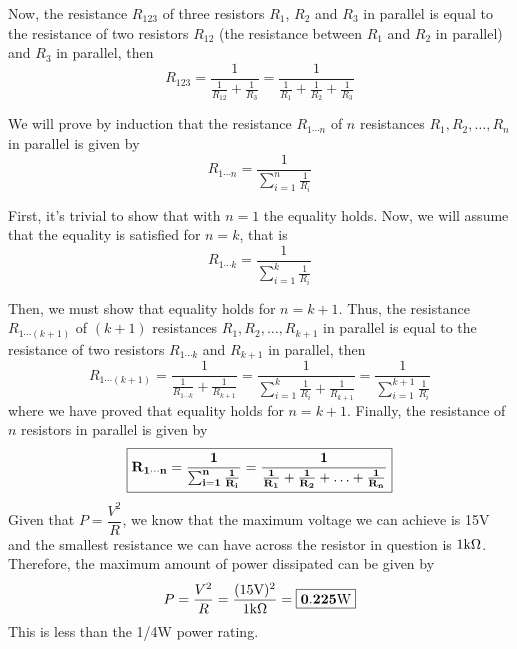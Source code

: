 \documentclass{article}
\begin{document}
    Now, the resistance $R_{123}$ of three resistors $R_{1}$, $R_{2}$ and $R_{3}$ in parallel is equal to the resistance of two resistors $R_{12}$ (the resistance between $R_{1}$ and $R_{2}$ in parallel) and $R_{3}$ in parallel, then \[R_{123} = \frac{1}{\frac{1}{R_{12}}+\frac{1}{R_{3}}} = \frac{1}{\frac{1}{R_{1}}+\frac{1}{R_{2}}+\frac{1}{R_{3}}}\]
    
    We will prove by induction that the resistance $R_{1\cdots n}$ of $n$ resistances $R_{1}, R_{2}, \ldots, R_{n}$ in parallel is given by \[R_{1\cdots n} = \dfrac{1}{\sum_{i=1}^{n}\frac{1}{R_{i}}}\]

    First, it's trivial to show that with $n = 1$ the equality holds. Now, we will assume that the equality is satisfied for $n = k$, that is
    \[R_{1\cdots k} = \dfrac{1}{\sum_{i=1}^{k}\frac{1}{R_{i}}}\]

    Then, we must show that equality holds for $n = k+1$. Thus, the resistance $R_{1\cdots (k+1)}$ of $(k+1)$ resistances $R_{1}, R_{2}, \ldots, R_{k+1}$ in parallel is equal to the resistance of two resistors $R_{1\cdots k}$ and $R_{k+1}$ in parallel, then \[R_{1\cdots (k+1)} = \frac{1}{\frac{1}{R_{1\cdots k}}+\frac{1}{R_{k+1}}} = \frac{1}{\sum_{i=1}^{k}\frac{1}{R_{i}}+\frac{1}{R_{k+1}}} = \frac{1}{\sum_{i=1}^{k+1}\frac{1}{R_{i}}}\]
    where we have proved that equality holds for $n = k+1$. Finally, the resistance of $n$ resistors in parallel is given by \[\boxed{\mathbf{R_{1\cdots n} = \dfrac{1}{\sum_{i=1}^{n}\frac{1}{R_{i}}} = \frac{1}{\frac{1}{R_{1}}+\frac{1}{R_{2}}+\ldots+\frac{1}{R_{n}}}}}\]
    Given that $P = \dfrac{V^2}{R}$, we know that the maximum voltage we can achieve is 15V and the smallest resistance we can have across the resistor in question is $1\text{k}\Omega$. Therefore, the maximum amount of power dissipated can be given by \[P = \frac{V^2}{R} = \frac{(15\text{V})^2}{1\text{k}\Omega} = \boxed{\mathbf{0.225\text{W}}}\]
    This is less than the 1/4W power rating.
\end{document}
